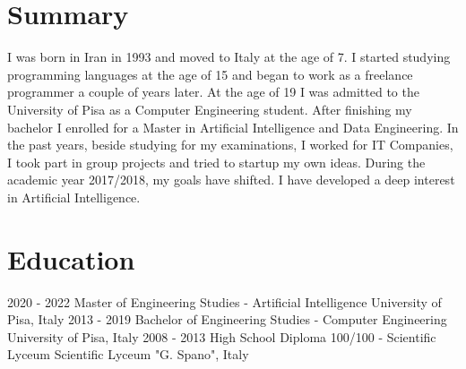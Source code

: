 \documentclass[]{friggeri-cv}
\begin{document}

\section{Summary}
\vspace{-3mm}
I was born in Iran in 1993 and moved to Italy at the age of 7. I started
studying programming languages at the age of 15 and began to work as a freelance
programmer a couple of years later. At the age of 19 I was admitted to the
University of Pisa as a Computer Engineering student. After finishing my
bachelor I enrolled for a Master in Artificial Intelligence and Data
Engineering. In the past years, beside studying for my examinations, I worked
for IT Companies, I took part in group projects and tried to startup my own ideas.
During the academic year 2017/2018, my goals have shifted. I have developed a
deep interest in Artificial Intelligence.


\section{Education}
\vspace{-3mm}
\begin{entrylist}
\entry
{2020 - 2022}
{Master {\normalfont\small{of Engineering Studies - Artificial Intelligence}}}
{University of Pisa, Italy}
{\vspace{-3mm}}
\entry
{2013 - 2019}
{Bachelor {\normalfont\small{of Engineering Studies - Computer Engineering}}}
{University of Pisa, Italy}
{\vspace{-3mm}}
\entry
{2008 - 2013}
{High School Diploma {\normalfont\small{100/100 - Scientific Lyceum}}}
{Scientific Lyceum "G. Spano", Italy}
{\vspace{-5mm}}
\end{entrylist}

\patchcmd{\entry}{14.8cm}{11.8cm}{}{}
\end{document}
